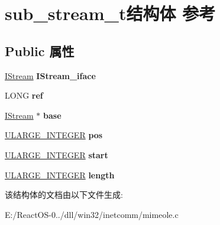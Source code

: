 \hypertarget{structsub__stream__t}{}\section{sub\+\_\+stream\+\_\+t结构体 参考}
\label{structsub__stream__t}
\subsection*{Public 属性}
\begin{DoxyCompactItemize}
\item 
\mbox{\label{structsub__stream__t_a241d1f494df14ad10e243e1826863fd5}} 
\hyperlink{interface_i_stream}{I\+Stream} {\bfseries I\+Stream\+\_\+iface}
\item 
\mbox{\label{structsub__stream__t_a2bd9dfc8ccca0e15b2fbca2d373a8752}} 
L\+O\+NG {\bfseries ref}
\item 
\mbox{\label{structsub__stream__t_a0be608ff86113a717e4fe306918f442b}} 
\hyperlink{interface_i_stream}{I\+Stream} $\ast$ {\bfseries base}
\item 
\mbox{\label{structsub__stream__t_aa1ab113fb5abb86edbaa5db4706c2701}} 
\hyperlink{struct___u_l_a_r_g_e___i_n_t_e_g_e_r}{U\+L\+A\+R\+G\+E\+\_\+\+I\+N\+T\+E\+G\+ER} {\bfseries pos}
\item 
\mbox{\label{structsub__stream__t_a65fdcfed7112d37d747f9acb1cce14a2}} 
\hyperlink{struct___u_l_a_r_g_e___i_n_t_e_g_e_r}{U\+L\+A\+R\+G\+E\+\_\+\+I\+N\+T\+E\+G\+ER} {\bfseries start}
\item 
\mbox{\label{structsub__stream__t_ada78410af0513b925855061ea961d284}} 
\hyperlink{struct___u_l_a_r_g_e___i_n_t_e_g_e_r}{U\+L\+A\+R\+G\+E\+\_\+\+I\+N\+T\+E\+G\+ER} {\bfseries length}
\end{DoxyCompactItemize}


该结构体的文档由以下文件生成\+:\begin{DoxyCompactItemize}
\item 
E\+:/\+React\+O\+S-\/0../dll/win32/inetcomm/mimeole.\+c\end{DoxyCompactItemize}
